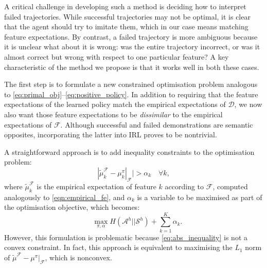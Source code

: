 \documentclass{aamas2016}
\newcommand{\aama}[1]{\textcolor{dim_gray}{AAMAS: #1}}
\begin{document}
A critical challenge in developing such a method is deciding how to interpret failed trajectories.  While successful trajectories may not be optimal, it is clear that the agent should try to imitate them, which in our case means matching feature expectations.  By contrast, a failed trajectory is more ambiguous because it is unclear what about it is wrong: was the entire trajectory incorrect, or was it almost correct but wrong with respect to one particular feature? A key characteristic of the method we propose is that it works well in both these cases.


The first step is to formulate a new constrained optimisation problem analogous to \eqref{eq:primal_obj}--\eqref{eq:positive_policy}. In addition to requiring that the feature expectations of the learned policy match the empirical expectations of $\mathcal{D}$, we now also want those feature expectations to be \emph{dissimilar} to the empirical expectations of $\mathcal{F}$. Although successful and failed demonstrations are semantic opposites, incorporating the latter into IRL proves to be nontrivial.

A straightforward approach is to add inequality constraints to the optimisation problem:
	\begin{equation}
        \label{eq:abs_inequality}
	|\widetilde{\mu}^{\mathcal{F}}_k  - \mu^{\pi}_k|_{\mathcal{F}}| > \alpha_k \quad\forall k,
	\end{equation} 
where $\widetilde{\mu}^{\mathcal{F}}_k$ is the empirical expectation of feature $k$ according to $\mathcal{F}$, computed analogously to \eqref{eqn:empirical_fe}, and $\alpha_k$ is a variable to be maximised as part of the optimisation objective, which becomes:
	\begin{equation}
		\quad\max\limits_{\pi,\alpha} H(\mathcal{A}^h||\mathcal{S}^h) + \sum^K_{k=1} \alpha_k.
	\end{equation}
However, this formulation is problematic because \eqref{eq:abs_inequality} is not a convex constraint. In fact, this approach is equivalent to maximising the $L_1$ norm of $\widetilde{\mu}^{\mathcal{F}}  - \mu^{\pi}|_{\mathcal{F}}$, which is nonconvex.
\end{document}
